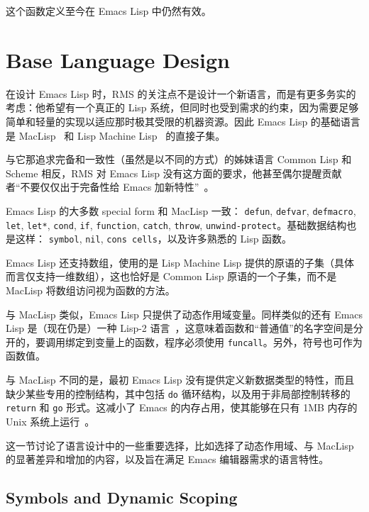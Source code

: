\documentclass[format=acmsmall,screen]{acmart}
\begin{document}
这个函数定义至今在 Emacs Lisp 中仍然有效。

\section{Base Language Design}
\label{sec:base-language-design}

在设计 Emacs Lisp 时，RMS 的关注点不是设计一个新语言，而是有更多务实的考虑：他希望有一个真正的 Lisp 系统，但同时也受到需求的约束，因为需要足够简单和轻量的实现以适应那时极其受限的机器资源。因此 Emacs Lisp 的基础语言是 MacLisp~\cite{Moon1974,Pitman1983} 和 Lisp Machine Lisp~\cite{WeinrebMoon1981} 的直接子集。

与它那追求完备和一致性（虽然是以不同的方式）的姊妹语言 Common Lisp 和 Scheme 相反，RMS 对 Emacs Lisp 没有这方面的要求，他甚至偶尔提醒贡献者“不要仅仅出于完备性给 Emacs 加新特性”~\cite{RMS-completeness}。

Emacs Lisp 的大多数 special form 和 MacLisp 一致： \texttt{defun}, \texttt{defvar}, \texttt{defmacro}, \texttt{let}, \texttt{let*}, \texttt{cond}, \texttt{if}, \texttt{function}, \texttt{catch}, \texttt{throw}, \texttt{unwind-protect}。基础数据结构也是这样： \texttt{symbol}, \texttt{nil}, \texttt{cons cells}，以及许多熟悉的 Lisp 函数。

Emacs Lisp 还支持数组，使用的是 Lisp Machine Lisp 提供的原语的子集（具体而言仅支持一维数组），这也恰好是 Common Lisp 原语的一个子集，而不是 MacLisp 将数组访问视为函数的方法。


与 MacLisp 类似，Emacs Lisp 只提供了动态作用域变量。同样类似的还有 Emacs Lisp 是（现在仍是）一种 Lisp-2 语言~\cite{SteeleGabriel1993}，这意味着函数和“普通值”的名字空间是分开的，要调用绑定到变量上的函数，程序必须使用 \texttt{funcall}。另外，符号也可作为函数值。

与 MacLisp 不同的是，最初 Emacs Lisp 没有提供定义新数据类型的特性，而且缺少某些专用的控制结构，其中包括 \texttt{do} 循环结构，以及用于非局部控制转移的 \texttt{return} 和 \texttt{go} 形式。这减小了 Emacs 的内存占用，使其能够在只有 1MB 内存的 Unix 系统上运行~\cite{Stallman2018-personal}。

这一节讨论了语言设计中的一些重要选择，比如选择了动态作用域、与 MacLisp 的显著差异和增加的内容，以及旨在满足 Emacs 编辑器需求的语言特性。

\subsection{Symbols and Dynamic Scoping}
\label{sec:symbols}
\end{document}
